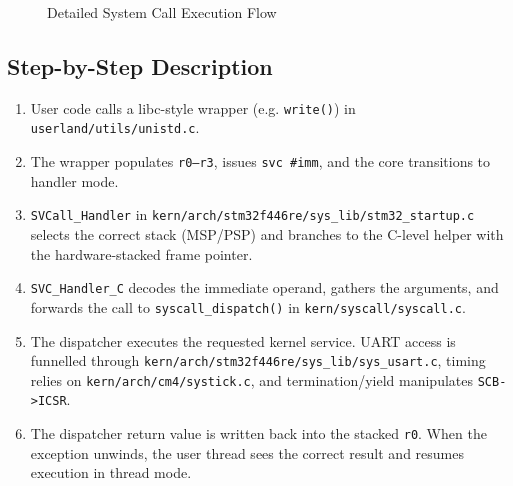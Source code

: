 \documentclass[11pt,a4paper]{article}
\newcommand{\file}[1]{\texttt{#1}}
\newcommand{\reg}[1]{\texttt{#1}}
\begin{document}
\begin{figure}[H]
\caption{Detailed System Call Execution Flow}
\label{fig:detailed-flow}
\end{figure}

\subsection{Step-by-Step Description}
\begin{enumerate}[leftmargin=2em,label=\arabic*.]
  \item User code calls a libc-style wrapper (e.g. \texttt{write()}) in \file{userland/utils/unistd.c}.
  \item The wrapper populates \reg{r0--r3}, issues \texttt{svc \#imm}, and the core transitions to handler mode.
  \item \texttt{SVCall\_Handler} in \file{kern/arch/stm32f446re/sys\_lib/stm32\_startup.c} selects the correct stack (MSP/PSP) and branches to the C-level helper with the hardware-stacked frame pointer.
  \item \texttt{SVC\_Handler\_C} decodes the immediate operand, gathers the arguments, and forwards the call to \texttt{syscall\_dispatch()} in \file{kern/syscall/syscall.c}.
  \item The dispatcher executes the requested kernel service. UART access is funnelled through \file{kern/arch/stm32f446re/sys\_lib/sys\_usart.c}, timing relies on \file{kern/arch/cm4/systick.c}, and termination/yield manipulates \reg{SCB->ICSR}.
  \item The dispatcher return value is written back into the stacked \reg{r0}. When the exception unwinds, the user thread sees the correct result and resumes execution in thread mode.
\end{enumerate}
\end{document}
